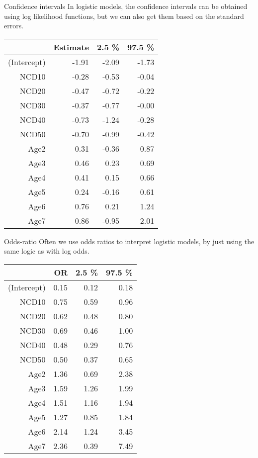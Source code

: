 \documentclass[11pt]{beamer}
\begin{document}
\begin{frame}{Confidence intervals}
In logistic models, the confidence intervals can be obtained using log likelihood functions, but we can also get them based on the standard errors.
\begin{table}[H]
\centering
\begin{tabular}{rrrr}
  \hline
 & Estimate & 2.5 \% & 97.5 \% \\ 
  \hline
(Intercept) & -1.91 & -2.09 & -1.73 \\ 
  NCD10 & -0.28 & -0.53 & -0.04 \\ 
  NCD20 & -0.47 & -0.72 & -0.22 \\ 
  NCD30 & -0.37 & -0.77 & -0.00 \\ 
  NCD40 & -0.73 & -1.24 & -0.28 \\ 
  NCD50 & -0.70 & -0.99 & -0.42 \\ 
  Age2 & 0.31 & -0.36 & 0.87 \\ 
  Age3 & 0.46 & 0.23 & 0.69 \\ 
  Age4 & 0.41 & 0.15 & 0.66 \\ 
  Age5 & 0.24 & -0.16 & 0.61 \\ 
  Age6 & 0.76 & 0.21 & 1.24 \\ 
  Age7 & 0.86 & -0.95 & 2.01 \\ 
   \hline
\end{tabular}
\end{table}
\end{frame}
\begin{frame}{Odds-ratio}
Often we use odds ratios to interpret logistic models, by just using the same logic as with log odds.
\begin{table}[ht]
\centering
\begin{tabular}{rrrr}
  \hline
 & OR & 2.5 \% & 97.5 \% \\ 
  \hline
(Intercept) & 0.15 & 0.12 & 0.18 \\ 
  NCD10 & 0.75 & 0.59 & 0.96 \\ 
  NCD20 & 0.62 & 0.48 & 0.80 \\ 
  NCD30 & 0.69 & 0.46 & 1.00 \\ 
  NCD40 & 0.48 & 0.29 & 0.76 \\ 
  NCD50 & 0.50 & 0.37 & 0.65 \\ 
  Age2 & 1.36 & 0.69 & 2.38 \\ 
  Age3 & 1.59 & 1.26 & 1.99 \\ 
  Age4 & 1.51 & 1.16 & 1.94 \\ 
  Age5 & 1.27 & 0.85 & 1.84 \\ 
  Age6 & 2.14 & 1.24 & 3.45 \\ 
  Age7 & 2.36 & 0.39 & 7.49 \\ 
   \hline
\end{tabular}
\end{table}
\end{frame}
\end{document}
